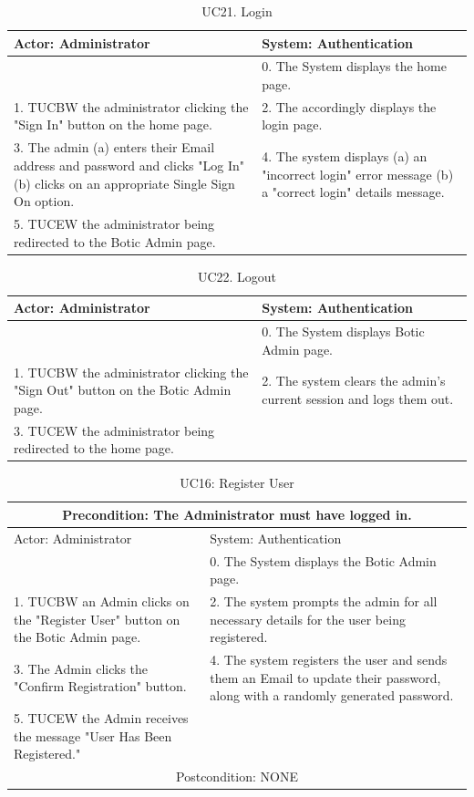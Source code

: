 \documentclass[11pt]{article}
\begin{document}
\begin{table}[h!]
	\centering
	\begin{tabular}{|p{8cm}|p{8cm}|}
		\hline
		Actor: Administrator & System: Authentication \\
		\hline
		 & 0. The System displays the home page.\\
		\hline
		1. TUCBW the administrator clicking the "Sign In" button on the home page. & 2. The accordingly displays the login page.\\
		\hline
		3. The admin (a) enters their Email address and password and clicks "Log In" (b) clicks on an appropriate Single Sign On option. & 4. The system displays (a) an "incorrect login" error message (b) a "correct login" details message. \\
		\hline
		5. TUCEW the administrator being redirected to the Botic Admin page. & \\
		\hline
	\end{tabular}
	\caption{UC21. Login}
\end{table}

\begin{table}[h!]
	\centering
	\begin{tabular}{|p{8cm}|p{8cm}|}
		\hline
		Actor: Administrator & System: Authentication \\
		\hline
		 & 0. The System displays Botic Admin page.\\
		\hline
		1. TUCBW the administrator clicking the "Sign Out" button on the Botic Admin page. & 2. The system clears the admin's current session and logs them out. \\
		\hline
		3. TUCEW the administrator being redirected to the home page. & \\
		\hline
	\end{tabular}
	\caption{UC22. Logout}
\end{table}
 
\begin{table}[h!]
	\centering
	\begin{tabular}{|p{8cm}|p{8cm}|}
		\hline
		\multicolumn{2}{|c|}{Precondition: The Administrator must have logged in.} \\
		\hline
		Actor: Administrator & System: Authentication \\
		\hline
		 & 0. The System displays the Botic Admin page.\\
		\hline
		1. TUCBW an Admin clicks on the "Register User" button on the Botic Admin page. & 2. The system prompts the admin for all necessary details for the user being registered. \\
		\hline
		3. The Admin clicks the "Confirm Registration" button. & 4. The system registers the user and sends them an Email to update their password, along with a randomly generated password. \\
		\hline
		5. TUCEW the Admin receives the message "User Has Been Registered." & \\
		\hline
		\multicolumn{2}{|c|}{Postcondition: NONE} \\
		\hline
	\end{tabular}
	\caption{UC16: Register User}
\end{table}
\end{document}
